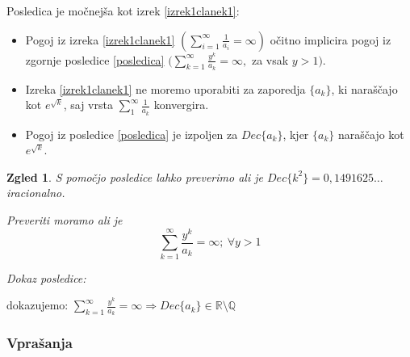 \documentclass{beamer}
\def\Q{\mathbb{Q}} %
\def\R{\mathbb{R}} %
\newtheorem{zgled}{Zgled}
\begin{document}
\begin{frame}
    Posledica je močnejša kot izrek \ref{izrek1clanek1}:
    \begin{itemize}
        \item Pogoj iz izreka \ref{izrek1clanek1} 
        $(\sum_{i=1}^{\infty} \frac{1}{a_i} = \infty)$ očitno implicira
        pogoj iz zgornje posledice \ref{posledica}
        $(\sum_{k=1}^{\infty}\frac{y^k}{a_k} = \infty ,$ za vsak $y > 1)$.
        \pause
        \item Izreka \ref{izrek1clanek1} ne moremo uporabiti za zaporedja $\{a_k\}$, ki naraščajo kot $e^{\sqrt{k}}$,
                saj vrsta $\sum_1^{\infty}\frac{1}{a_k}$ konvergira.
            \pause
        \item Pogoj iz posledice \ref{posledica} je izpoljen za $Dec\{a_k\}$, kjer $\{a_k\}$ naraščajo kot $e^{\sqrt{k}}$.

    \end{itemize}
\end{frame}

\begin{frame}
    \begin{zgled}
        S pomočjo posledice lahko preverimo ali je $Dec\{k^2\} = 0,1491625\dots$ iracionalno.
        \pause
        
        Preveriti moramo ali je \[\sum_{k=1}^{\infty}\frac{y^k}{a_k} = \infty; \ \forall y > 1\]
    \end{zgled}
    

\end{frame}

\begin{frame}
    \emph{Dokaz posledice:}

    dokazujemo: $\sum_{k=1}^{\infty}\frac{y^k}{a_k} = \infty \Rightarrow Dec\{a_k\} \in \R \setminus \Q$
    \newline
    \newline
    \newline
    \newline
    \newline
    \newline
    \newline
    \newline
    \newline
    \newline
    \newline
    \newline
    \newline
\end{frame}

\begin{frame}
    \frametitle{Vprašanja}
\end{frame}
\end{document}
